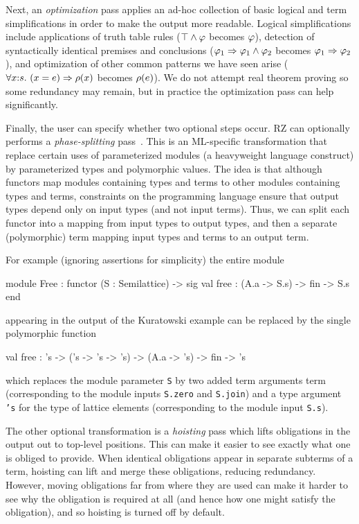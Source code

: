 Next, an \emph{optimization} pass applies an ad-hoc collection of
basic logical and term simplifications in order to make the output more readable. 
Logical simplifications include applications of truth table rules
($\top\land \varphi$ becomes $\varphi$), detection of syntactically
identical premises and conclusions
($\varphi_1\Rightarrow \varphi_1\land \varphi_2$ becomes
$\varphi_1\Rightarrow \varphi_2$), and optimization of other common patterns we have
seen arise
($\forall x{:}s.\ (x = e)\Rightarrow \rho(x)$ becomes
$\rho(e)$). We do not attempt real theorem proving 
so some redundancy may remain, but in practice the optimization pass
can help significantly.

Finally, the user can specify whether two optional steps occur.
RZ can optionally performs a \emph{phase-splitting} pass~\cite{harper+:popl90}. 
This is an ML-specific transformation that replace certain
uses of parameterized modules (a heavyweight language construct) by
parameterized types and polymorphic values. The idea is that although
functors map modules containing types and terms to other modules containing types
and terms, constraints on the programming language ensure that output types
depend only on input types (and not input terms).  Thus, we can split each
functor into a mapping from input types to output types, and then a separate
(polymorphic) term mapping input types and terms to an output term.

For example (ignoring
assertions for simplicity) the entire module
\begin{source}
module Free : functor (S : Semilattice) ->
                    sig
                      val free : (A.a -> S.s) -> fin -> S.s
                    end	
\end{source}   
appearing in the output of the Kuratowski example can be replaced by the single polymorphic function
\begin{source}
val free : 's -> ('s -> 's -> 's) -> (A.a -> 's) -> fin -> 's	
\end{source}
which replaces the module parameter \texttt{S} by two added term arguments term (corresponding to the module inputs \texttt{S.zero} and \texttt{S.join}) 
and a type argument \texttt{'s} for the type of lattice elements (corresponding to the module input \texttt{S.s}).

The other optional transformation is a \emph{hoisting} pass which lifts obligations in the output out to top-level positions.  This can make it easier to see exactly what one is obliged to provide.  When identical obligations appear in separate subterms of a term, hoisting can lift and merge these obligations, reducing redundancy.  However, moving obligations far from where they are used can make it harder to see why the obligation is required at all (and hence how one might satisfy the obligation), and so hoisting is turned off by default.

